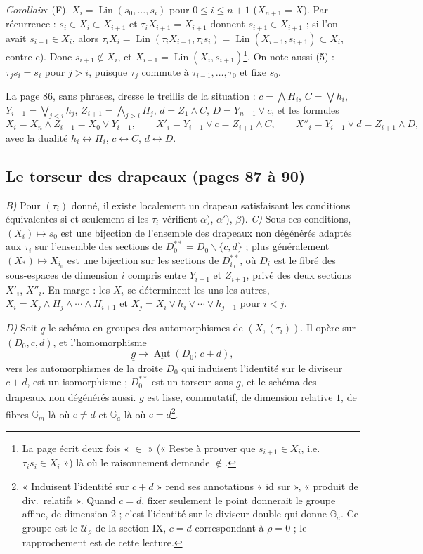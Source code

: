 \documentclass[11pt,a4paper]{article}
\begin{document}
\emph{Corollaire} (F). $X_i = \operatorname{Lin}(s_0, \ldots, s_i)$ pour $0
\leqslant i \leqslant n+1$ ($X_{n+1} = X$). Par récurrence : $s_i \in X_i
\subset X_{i+1}$ et $\tau_i X_{i+1} = X_{i+1}$ donnent $s_{i+1} \in X_{i+1}$ ;
si l'on avait $s_{i+1} \in X_i$, alors $\tau_i X_i = \operatorname{Lin}(\tau_i
X_{i-1}, \tau_i s_i) = \operatorname{Lin}(X_{i-1}, s_{i+1}) \subset X_i$,
contre c). Donc $s_{i+1} \notin X_i$, et $X_{i+1} = \operatorname{Lin}(X_i,
s_{i+1})$\footnote{La page écrit deux fois « $\in$ » (« Reste à prouver que
$s_{i+1} \in X_i$, i.e.\ $\tau_i s_i \in X_i$ ») là où le raisonnement demande
$\notin$.}. On note aussi (5) : $\tau_j s_i = s_i$ pour $j > i$, puisque $\tau_j$
commute à $\tau_{i-1}, \ldots, \tau_0$ et fixe $s_0$.

La page 86, sans phrases, dresse le treillis de la situation : $c =
\bigwedge H_i$, $C = \bigvee h_i$, $Y_{i-1} = \bigvee_{j < i} h_j$, $Z_{i+1} =
\bigwedge_{j > i} H_j$, $d = Z_1 \wedge C$, $D = Y_{n-1} \vee c$, et les
formules
\[
X_i = X_n \wedge Z_{i+1} = X_0 \vee Y_{i-1}, \qquad X'_i = Y_{i-1} \vee c =
Z_{i+1} \wedge C, \qquad X''_i = Y_{i-1} \vee d = Z_{i+1} \wedge D ,
\]
avec la dualité $h_i \leftrightarrow H_i$, $c \leftrightarrow C$, $d
\leftrightarrow D$.

\subsection*{Le torseur des drapeaux (pages 87 à 90)}

\emph{B)} Pour $(\tau_i)$ donné, il existe localement un drapeau satisfaisant
les conditions équivalentes si et seulement si les $\tau_i$ vérifient
$\alpha$), $\alpha'$), $\beta$). \emph{C)} Sous ces conditions, $(X_i)
\mapsto s_0$ est une bijection de l'ensemble des drapeaux non dégénérés
adaptés aux $\tau_i$ sur l'ensemble des sections de $D_0^{**} = D_0
\smallsetminus \{c, d\}$ ; plus généralement $(X_*) \mapsto X_{i_0}$ est une
bijection sur les sections de $D_{i_0}^{**}$, où $D_i$ est le fibré des
sous-espaces de dimension $i$ compris entre $Y_{i-1}$ et $Z_{i+1}$, privé des
deux sections $X'_i$, $X''_i$. En marge : les $X_i$ se déterminent les uns les
autres, $X_i = X_j \wedge H_j \wedge \cdots \wedge H_{i+1}$ et $X_j = X_i \vee
h_i \vee \cdots \vee h_{j-1}$ pour $i < j$.

\emph{D)} Soit $\underline{g}$ le schéma en groupes des automorphismes de $(X,
(\tau_i))$. Il opère sur $(D_0, c, d)$, et l'homomorphisme
\[
\underline{g} \longrightarrow \underline{\operatorname{Aut}}(D_0;\, c + d),
\]
vers les automorphismes de la droite $D_0$ qui induisent l'identité sur le
diviseur $c + d$, est un isomorphisme ; $D_0^{**}$ est un torseur sous
$\underline{g}$, et le schéma des drapeaux non dégénérés aussi. $\underline g$
est lisse, commutatif, de dimension relative $1$, de fibres $\mathbb{G}_m$ là
où $c \neq d$ et $\mathbb{G}_a$ là où $c = d$\footnote{« Induisent l'identité
sur $c + d$ » rend ses annotations « id sur », « produit de div.\ relatifs ».
Quand $c = d$, fixer seulement le point donnerait le groupe affine, de
dimension $2$ ; c'est l'identité sur le diviseur double qui donne
$\mathbb{G}_a$. Ce groupe est le $\mathcal{U}_\rho$ de la section IX, $c = d$
correspondant à $\rho = 0$ ; le rapprochement est de cette lecture.}.
\end{document}
